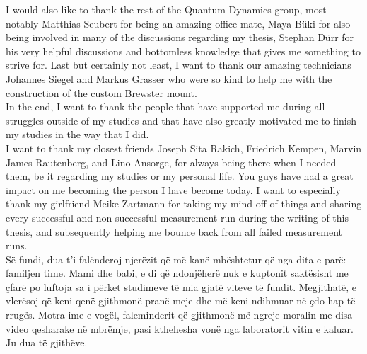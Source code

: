 I would also like to thank the rest of the Quantum Dynamics group, most notably Matthias Seubert for being an amazing office mate, Maya Büki for also being involved in many of the discussions regarding my thesis, Stephan Dürr for his very helpful discussions and bottomless knowledge that gives me something to strive for. Last but certainly not least, I want to thank our amazing technicians Johannes Siegel and Markus Grasser who were so kind to help me with the construction of the custom Brewster mount. \\

In the end, I want to thank the people that have supported me during all struggles outside of my studies and that have also greatly motivated me to finish my studies in the way that I did.\\

I want to thank my closest friends Joseph Sita Rakich, Friedrich Kempen, Marvin James Rautenberg, and Lino Ansorge, for always being there when I needed them, be it regarding my studies or my personal life. You guys have had a great impact on me becoming the person I have become today. I want to especially thank my girlfriend Meike Zartmann for taking my mind off of things and sharing every successful and non-successful measurement run during the writing of this thesis, and subsequently helping me bounce back from all failed measurement runs.\\

Së fundi, dua t'i falënderoj njerëzit që më kanë mbështetur që nga dita e parë: familjen time.  Mami dhe babi, e di që ndonjëherë nuk e kuptonit saktësisht me çfarë po luftoja sa i përket studimeve të mia gjatë viteve të fundit. Megjithatë, e vlerësoj që keni qenë gjithmonë pranë meje dhe më keni ndihmuar në çdo hap të rrugës. Motra ime e vogël, faleminderit që gjithmonë më ngreje moralin me disa video qesharake në mbrëmje, pasi kthehesha vonë nga laboratorit vitin e kaluar. Ju dua të gjithëve.